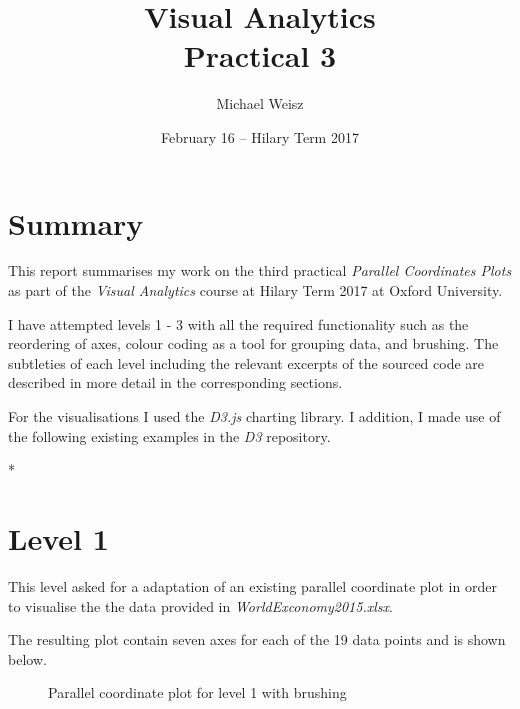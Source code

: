 \documentclass[]{article}
\title{Visual Analytics \\ Practical 3}
\author{Michael Weisz}
\date{February 16 -- Hilary Term 2017 }
\begin{document}
\maketitle


\section*{Summary}
This report summarises my work on the third practical \emph{Parallel Coordinates Plots} as part of the \emph{Visual Analytics} course at Hilary Term 2017 at Oxford University.

I have attempted levels 1 - 3 with all the required functionality such as the reordering of axes, colour coding as a tool for grouping data, and brushing. The subtleties of each level including the relevant excerpts of the sourced code are described in more detail in the corresponding sections. 

For the visualisations I used the \emph{D3.js} 
charting library. I addition, I made use of the following existing examples in the \emph{D3} repository.

* 



\section*{Level 1}
This level asked for a adaptation of an existing parallel coordinate plot in order to visualise the the data provided in \emph{WorldExconomy2015.xlsx}.

The resulting plot contain seven axes for each of the 19 data points and is shown below. 


\begin{figure}[t]

	\centering
	\caption{Parallel coordinate plot for level 1 with brushing}
\end{figure}
\end{document}
